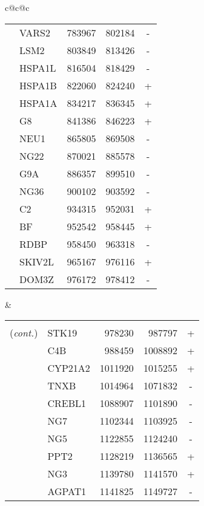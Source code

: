 \begin{tabular}{c@{\quad}c@{\quad}c}
\begin{tabular}[t]{|r|lrrc|}
         & VARS2      &   783967 &   802184 & - \\
         & LSM2       &   803849 &   813426 & - \\
         & HSPA1L     &   816504 &   818429 & - \\
         & HSPA1B     &   822060 &   824240 & + \\
         & HSPA1A     &   834217 &   836345 & + \\
         & G8         &   841386 &   846223 & + \\
         & NEU1       &   865805 &   869508 & - \\
         & NG22       &   870021 &   885578 & - \\
         & G9A        &   886357 &   899510 & - \\
         & NG36       &   900102 &   903592 & - \\
         & C2         &   934315 &   952031 & + \\
         & BF         &   952542 &   958445 & + \\
         & RDBP       &   958450 &   963318 & - \\
         & SKIV2L     &   965167 &   976116 & + \\
         & DOM3Z      &   976172 &   978412 & - \\
\hline
\end{tabular}
 &
\begin{tabular}[t]{|r|lrrc|}
\hline
\lb{1cm}{r}{SEQ} & \lb{1.5cm}{l}{GENE} & \lb{1cm}{r}{START} & \lb{1cm}{r}{END} & \lb{0.5cm}{c}{STR} \\
\hline
\raisebox{-2.25ex}{\shortstack{MHC\\(\textit{cont.})}} & STK19      &   978230 &   987797 & + \\[-1.75ex]
         & C4B        &   988459 &  1008892 & + \\
         & CYP21A2    &  1011920 &  1015255 & + \\
         & TNXB       &  1014964 &  1071832 & - \\
         & CREBL1     &  1088907 &  1101890 & - \\
         & NG7        &  1102344 &  1103925 & - \\
         & NG5        &  1122855 &  1124240 & - \\
         & PPT2       &  1128219 &  1136565 & + \\
         & NG3        &  1139780 &  1141570 & + \\
         & AGPAT1     &  1141825 &  1149727 & - \\

\end{tabular}
\end{tabular}
